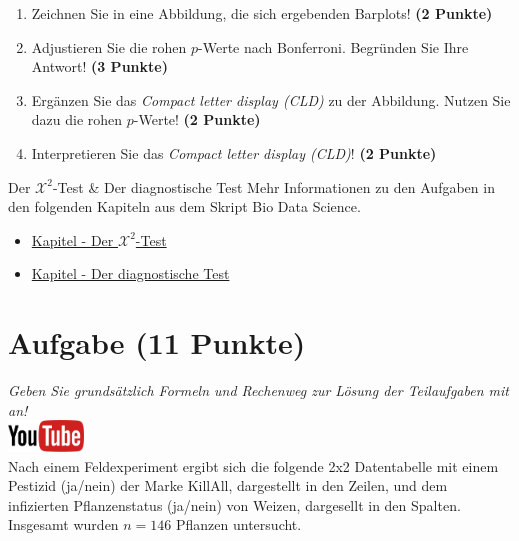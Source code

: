 \documentclass[a4paper, 9pt]{scrartcl}\usepackage[]{graphicx}\usepackage[]{xcolor}
\begin{document}
\begin{enumerate}
\item Zeichnen Sie in eine Abbildung, die sich ergebenden Barplots! \textbf{(2 Punkte)}
\item Adjustieren Sie die rohen $p$-Werte nach Bonferroni. Begr{\"u}nden Sie Ihre Antwort! \textbf{(3 Punkte)}
\item Erg{\"a}nzen Sie das \textit{Compact letter display (CLD)} zu der
  Abbildung. Nutzen Sie dazu die rohen $p$-Werte! \textbf{(2 Punkte)}
\item Interpretieren Sie das \textit{Compact letter display (CLD)}! \textbf{(2 Punkte)} 
\end{enumerate}

 
\clearpage
  \begin{graybox}{Der $\mathcal{X}^2$-Test \& Der diagnostische Test}
Mehr Informationen zu den Aufgaben in den folgenden Kapiteln aus dem Skript Bio Data Science.
  \begin{itemize}
  \item \href{https://jkruppa.github.io/stat-tests-chi-test.html}{Kapitel - Der $\mathcal{X}^2$-Test}
  \item \href{https://jkruppa.github.io/stat-tests-diagnostic.html}{Kapitel - Der diagnostische Test}
  \end{itemize}
\end{graybox}
\clearpage

\section{Aufgabe \hfill (11 Punkte)}

\textit{Geben Sie grunds{\"a}tzlich Formeln und Rechenweg zur L{\"o}sung der
  Teilaufgaben mit an!} \\[1Ex]

\hfill\href{https://youtu.be/-Kva5wc5Elw}{\includegraphics[width =
  2cm]{img/youtube}}\\[1Ex]




Nach einem Feldexperiment ergibt sich die folgende 2x2 Datentabelle mit einem
Pestizid (ja/nein) der Marke KillAll, dargestellt in den Zeilen, und
dem infizierten Pflanzenstatus (ja/nein) von Weizen, dargesellt in
den Spalten. Insgesamt wurden $n = 146$ Pflanzen untersucht.
\vspace{5Ex}
\end{document}
